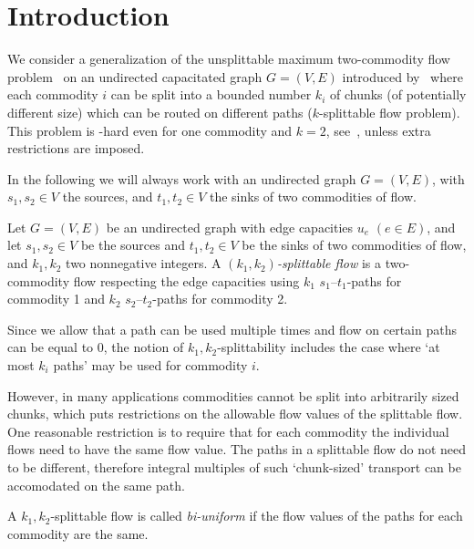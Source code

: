 \section{Introduction}
\label{sec:introduction}

We consider a generalization of the unsplittable maximum two-commodity
flow problem~\cite{kleinberg:96} on an undirected capacitated graph
$G=(V,E)$ introduced by~\cite{baier-koehler-skutella:02} where each
commodity $i$ can be split into a bounded number $k_i$ of chunks (of
potentially different size) which can be routed on different paths
($k$-splittable flow problem). This problem is \NP-hard even for one
commodity and $k=2$, see~\cite{baier-koehler-skutella:05}, unless
extra restrictions are imposed.

In the following we will always work with an undirected graph
$G=(V,E)$, with $s_1,s_2\in V$ the sources, and $t_1,t_2\in V$ the
sinks of two commodities of flow.

\begin{definition}
  Let $G=(V,E)$ be an undirected graph with edge capacities $u_e$
  $(e\in E)$, and let $s_1,s_2\in V$ be the
  sources and $t_1,t_2\in V$  be the sinks of two commodities of
  flow, and $k_1,k_2$ two nonnegative integers. A
  \emph{$(k_1,k_2)$-splittable flow} is a two-commodity flow
  respecting the edge capacities using
  $k_1$ $s_1$--$t_1$-paths for commodity 1 and $k_2$
  $s_2$--$t_2$-paths for commodity 2.
\end{definition}

Since we allow that a path can be used multiple times and flow on
certain paths can  be equal to $0$, the notion of
$k_1,k_2$-splittability includes the case where `at most $k_i$ paths'
may be used for commodity $i$.
 
However, in many applications commodities cannot be split into arbitrarily
sized chunks, which  puts restrictions on the allowable
flow values of the splittable flow. One reasonable restriction is to
require that for each commodity the individual flows need to have the
same flow value. The paths in a splittable flow do not
need to be different, therefore integral multiples of such `chunk-sized'
transport can be accomodated on the same path.

\begin{definition}
  A $k_1,k_2$-splittable flow is called \emph{bi-uniform} if the flow
  values of the paths for each commodity are the same.
\end{definition}

